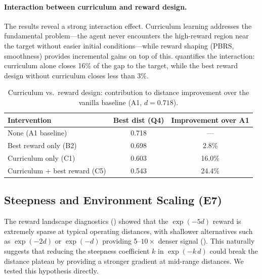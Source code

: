 \documentclass[11pt]{article}
\begin{document}
\paragraph{Interaction between curriculum and reward design.}
The results reveal a strong interaction effect.
Curriculum learning addresses the fundamental problem---the agent never encounters the high-reward region near the target without easier initial conditions---while reward shaping (PBRS, smoothness) provides incremental gains on top of this.
 quantifies the interaction: curriculum alone closes 16\% of the gap to the target, while the best reward design without curriculum closes less than 3\%.

\begin{table}[H]
  \centering
  \small
  \renewcommand{\arraystretch}{1.3}
  \caption{Curriculum vs.\ reward design: contribution to distance improvement over the vanilla baseline (A1, $d = 0.718$).}
  \label{tab:ablation-v2-interaction}
  \begin{tabular}{@{}lcc@{}}
    \toprule
    \textbf{Intervention} & \textbf{Best dist (Q4)} & \textbf{Improvement over A1} \\
    \midrule
    None (A1 baseline)            & 0.718 & ---    \\
    Best reward only (B2)         & 0.698 & 2.8\%  \\
    Curriculum only (C1)          & 0.603 & 16.0\% \\
    Curriculum + best reward (C5) & 0.543 & 24.4\% \\
    \bottomrule
  \end{tabular}
\end{table}

\subsection{Steepness and Environment Scaling (E7)}
\label{sec:reward:steepness}

The reward landscape diagnostics () showed that the $\exp(-5d)$ reward is extremely sparse at typical operating distances, with shallower alternatives such as $\exp(-2d)$ or $\exp(-d)$ providing 5--$10\times$ denser signal ().
This naturally suggests that reducing the steepness coefficient $k$ in $\exp(-k\,d)$ could break the distance plateau by providing a stronger gradient at mid-range distances.
We tested this hypothesis directly.
\end{document}
